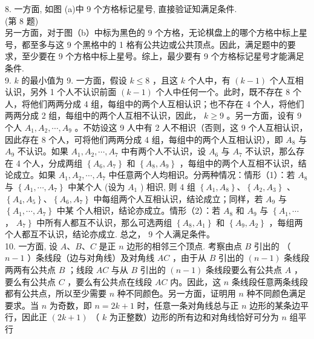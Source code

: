 \documentclass[10pt]{article}
\begin{document}
8. 一方面, 如图 (a)中 9 个方格标记星号, 直接验证知满足条件.\\
(第 8 题)\\
另一方面，对于图（b）中标为黑色的 9 个方格，无论棋盘上的哪个方格中标上星号，都至多与这 9 个黑格中的 1 格有公共边或公共顶点。因此，满足题中的要求，至少要在 9 个方格中标上星号。综上，最少要有 9 个方格标记星号才能满足条件.\\
9. $k$ 的最小值为 9. 一方面，假设 $k \leqslant 8$ ，且这 $k$ 个人中，有 $(k-1)$ 个人互相认识，另外 1 个人不认识前面 $(k-1)$ 个人中任何一个。此时，既不存在 8 个人，将他们两两分成 4 组，每组中的两个人互相认识；也不存在 4 个人，将他们两两分成 2 组，每组中的两个人互相不认识，因此， $k \geqslant 9$ 。另一方面，设有 9 个人 $A_{1}, A_{2}, \cdots, A_{9}$ 。不妨设这 9 人中有 2 人不相识（否则，这 9 个人互相认识，因此存在 8 个人，可将他们两两分成 4 组，每组中的两个人互相认识），即 $A_{8}$ 与 $A_{9}$ 不认识。如果 $A_{1}, A_{2}, \cdots, A_{7}$ 中有两个人不认识，设 $A_{6}$ 与 $A_{7}$ 不认识，那么存在 4 个人，分成两组 $\left\{A_{6}, A_{7}\right\}$ 和 $\left\{A_{8}, A_{9}\right\}$ ，每组中的两个人互相不认识，结论成立。如果 $A_{1}, A_{2}, \cdots, A_{7}$ 中任意两个人均相识。分两种情况：情形（1）：若 $A_{8}$ 与 $\left\{A_{1}, \cdots, A_{7}\right\}$ 中某个人 (设为 $A_{1}$ ) 相识, 则 4 组 $\left\{A_{1}, A_{8}\right\} 、\left\{A_{2}, A_{3}\right\}$ 、 $\left\{A_{4}, A_{5}\right\} 、\left\{A_{6}, A_{7}\right\}$ 中每组两个人互相认识，结论成立；同样，若 $A_{9}$ 与 $\left\{A_{1}, \cdots, A_{7}\right\}$ 中某 个人相识，结论亦成立。情形（2）：若 $A_{8}$ 和 $A_{9}$ 与 $\left\{A_{1}, \cdots\right.$ ， $\left.A_{7}\right\}$ 中所有人都互不认识，那么可选两组 $\left\{A_{8}, A_{1}\right\}$ 和 $\left\{A_{9}, A_{2}\right\}$ ，每组两个人都互不认识，结论亦成立. 总之， 9 个人满足条件。\\
10. 一方面, 设 $A 、 B 、 C$ 是正 $n$ 边形的相邻三个顶点. 考察由点 $B$ 引出的 （ $n-1$ ）条线段（边与对角线）及对角线 $A C$ ，由于从 $B$ 引出的 $(n-1)$ 条线段两两有公共点 $B$ ；线段 $A C$ 与从 $B$ 引出的 $(n-1)$ 条线段要么有公共点 $A$ ，要么有公共点 $C$ ，要么有公共点在线段 $A C$ 内。因此，这 $n$ 条线段任意两条线段都有公共点，所以至少需要 $n$ 种不同颜色。另一方面，证明用 $n$ 种不同颜色满足要求。当 $n$ 为奇数，即 $n=2 k+1$ 时，任意一条对角线总与正 $n$ 边形的某条边平行，因此正 $(2 k+1)$ （ $k$ 为正整数）边形的所有边和对角线恰好可分为 $n$ 组平行
\end{document}
